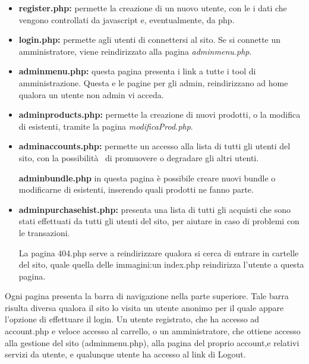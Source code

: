 \begin{itemize}
\item \textbf{register.php:} permette la creazione di un nuovo utente, con le i dati che vengono controllati da javascript e, eventualmente, da php.

\item \textbf{login.php:} permette agli utenti di connettersi al sito. Se si connette un amministratore, viene reindirizzato alla pagina \textit{adminmenu.php}.

\item \textbf{adminmenu.php:} questa pagina presenta i link a tutte i tool di amministrazione. Questa e le pagine per gli admin, reindirizzano ad home qualora un utente non admin vi acceda.

\item \textbf{adminproducts.php:} permette la creazione di nuovi prodotti, o la modifica di esistenti, tramite la pagina \textit{modificaProd.php}.

\item \textbf{adminaccounts.php:} permette un accesso alla lista di tutti gli utenti del sito, con la possibilità  di promuovere o degradare gli altri utenti.

\itema \textbf{adminbundle.php} in questa pagina è possibile creare nuovi bundle o modificarne di esistenti, inserendo quali prodotti ne fanno parte.

\item \textbf{adminpurchasehist.php:} presenta una lista di tutti gli acquisti che sono stati effettuati da tutti gli utenti del sito, per aiutare in caso di problemi con le transazioni.

La pagina 404.php serve a reindirizzare qualora si cerca di entrare in cartelle del sito, quale quella delle immagini:un index.php reindirizza l'utente a questa pagina.

\end{itemize}
Ogni pagina presenta la barra di navigazione nella parte superiore. Tale barra risulta diversa qualora il sito lo visita un utente anonimo per il quale appare l'opzione di effettuare il login. Un utente registrato, che ha accesso ad account.php e veloce accesso al carrello, o un amministratore, che ottiene accesso alla gestione del sito (adminmenu.php), alla pagina del proprio account,e relativi servizi da utente, e qualunque utente ha accesso al link di Logout.

